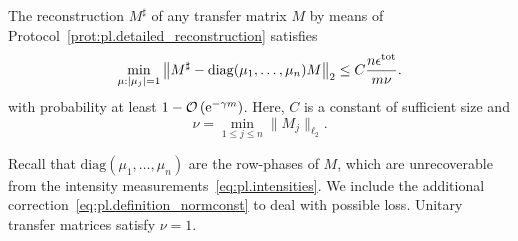 \begin{corollary}%
  \label{cor:pl.performance_guarantee}
  The reconstruction ${M}^\sharp$ of any transfer matrix ${M}$ by means of Protocol~\ref{prot:pl.detailed_reconstruction} satisfies
    \[
      \min_{{\mu}: {\vert\mu_j\vert} = 1} \left\|  {M}^\sharp -  \mathrm{diag}(\mu_1,\ldots,\mu_n) {M} \right\|_2
      \leq C \frac{n \epsilon^\mathrm{tot}}{m \nu}.
      \label{eq:pl.total_bound}
    \]
  with probability at least $1 - {\mathcal{O}} \left( \mathrm{e}^{-\gamma m}\right)$.
  Here, $C$ is a constant of sufficient size and
  \[
    \nu = \min_{1 \leq j \leq n} \| {M}_j \|_{\ell_2}.
    \label{eq:pl.definition_normconst}
  \]
\end{corollary}
Recall that $\mathrm{diag}(\mu_1, \ldots, \mu_n)$ are the row-phases of ${M}$, which are unrecoverable from the intensity measurements~\eqref{eq:pl.intensities}.
We include the additional correction~\eqref{eq:pl.definition_normconst} to deal with possible loss.
Unitary transfer matrices satisfy $\nu = 1$.

